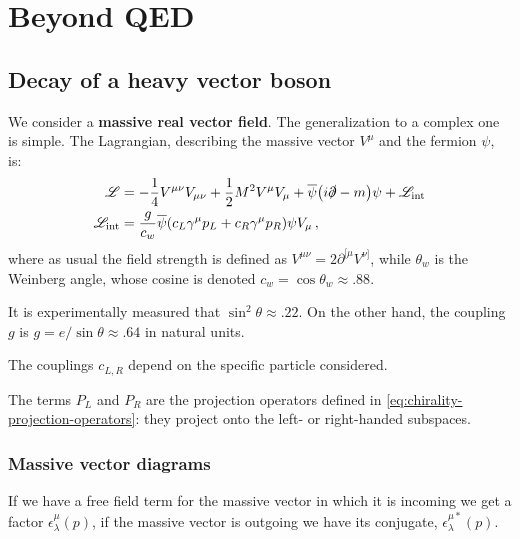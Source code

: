 \documentclass[main.tex]{subfiles}
\begin{document}
\chapter{Beyond QED}

\section{Decay of a heavy vector boson}


We consider a \textbf{massive real vector field}. The generalization to a complex one is simple. 
The Lagrangian, describing the massive vector \(V^{\mu }\) and the fermion \(\psi \), is: 
%
\begin{align}
\mathscr{L} &= - \frac{1}{4} V^{\mu \nu } V_{\mu \nu } 
+ \frac{1}{2} M^2 V^{\mu } V_{\mu } 
+ \overline{\psi} \qty(i \slashed{\partial} - m) \psi 
+ \mathscr{L} _{\text{int}} \\ 
\mathscr{L} _{\text{int}} &= 
\frac{g}{c_{w}} \overline{\psi} \qty(
    c_L \gamma^{\mu } p_L +
    c_R \gamma^{\mu } p_R 
) \psi V_{\mu }
\,,
\end{align}
%
where as usual the field strength is defined as \(V^{\mu \nu } = 2 \partial^{[\mu } V^{\nu ]}\), while \(\theta_{w}\) is the Weinberg angle, whose cosine is denoted \(c_w = \cos \theta_{w} \approx \num{.88}\). 

It is experimentally measured that \(\sin^2\theta \approx \num{.22}\). 
On the other hand, the coupling \(g\) is \(g = e / \sin \theta \approx \num{.64} \) in natural units. 

The couplings \(c_{L, R}\) depend on the specific particle considered. 

The terms \(P_L\) and \(P_R\) are the projection operators defined in \eqref{eq:chirality-projection-operators}: they project onto the left- or right-handed subspaces. 

\subsection{Massive vector diagrams}

If we have a free field term for the massive vector in which it is incoming we get a factor \(\epsilon^{\mu }_{\lambda } (p)\), if the massive vector is outgoing we have its conjugate, \(\epsilon^{\mu *}_{\lambda } (p)\). 
\end{document}
